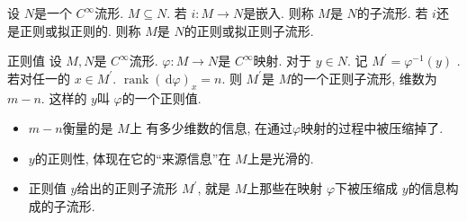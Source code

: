 \documentclass[../main.tex]{subfiles}
\begin{document}
\begin{definition}{}{}
  设 \(  N  \)是一个 \(  C^{\infty}  \)流形.  \(  M\subseteq N  \). 若 \(  i: M\to N  \)是嵌入. 则称 \(  M  \)是 \(  N  \)的子流形. 若 \(  i  \)还是正则或拟正则的. 则称 \(  M  \)是 \(  N  \)的正则或拟正则子流形.          
\end{definition}

\begin{theorem}{正则值}{}
  设 \(  M,N  \)是 \(  C^{\infty}  \)流形. \(   \varphi :M\to N  \)是 \(  C^{\infty}  \)映射. 对于 \(  y \in N  \). 记 \(  M^{\prime} =  \varphi ^{-1} \left( y \right)   \) . 若对任一的 \(  x \in M^{\prime}   \). \(  \operatorname{rank}\left( \,\mathrm{d}  \varphi  \right)_{x}= n   \). 则 \(  M^{\prime}   \)是 \(  M  \)的一个正则子流形, 维数为 \(  m-n  \).   这样的 \(  y  \)叫 \(   \varphi   \)的一个正则值.            
\end{theorem}
\begin{note}
  \begin{itemize}
    \item \(  m-n  \)衡量的是 \(  M  \)上 有多少维数的信息, 在通过\(   \varphi   \)映射的过程中被压缩掉了. 
    \item  \(  y  \)的正则性, 体现在它的“来源信息”在 \(  M  \)上是光滑的. 
    \item 正则值 \(  y  \)给出的正则子流形 \(  M^{\prime}   \), 就是 \(  M  \)上那些在映射 \(   \varphi   \)下被压缩成 \(  y  \)的信息构成的子流形.        
  \end{itemize}
  
\end{note}
\end{document}
